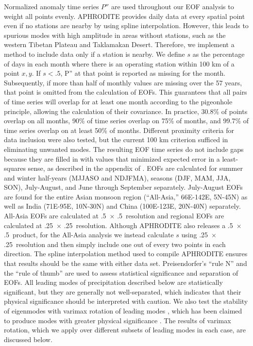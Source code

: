 \documentclass[12pt]{article}
\begin{document}
	Normalized anomaly time series $P''$ are used throughout our EOF analysis to weight all points evenly. APHRODITE provides daily data at every spatial point even if no stations are nearby by using spline interpolation. However, this leads to spurious modes with high amplitude in areas without stations, such as the western Tibetan Plateau and Taklamakan Desert. Therefore, we implement a method to include data only if a station is nearby. We define $s$ as the percentage of days in each month where there is an operating station within 100 km of a point $x,y$. If $s<.5$, P'' at that point is reported as missing for the month. Subsequently, if more than half of monthly values are missing over the 57 years, that point is omitted from the calculation of EOFs. This guarantees that all pairs of time series will overlap for at least one month according to the pigeonhole principle, allowing the calculation of their covariance. In practice, 30.8\% of points overlap on all months, 90\% of time series overlap on 75\% of months, and 99.7\% of time series overlap on at least 50\% of months. Different proximity criteria for data inclusion were also tested, but the current 100 km criterion sufficed in eliminating unwanted modes. The resulting EOF time series do not include gaps because they are filled in with values that minimized expected error in a least-squares sense, as described in the appendix of \cite{Chelton1982}. EOFs are calculated for summer and winter half-years (MJJASO and NDJFMA), seasons (DJF, MAM, JJA, SON), July-August, and June through September separately. July-August EOFs are found for the entire Asian monsoon region (``All-Asia,'' 66\textdegree E-142\textdegree E, 5\textdegree N-45\textdegree N)  as well as India (71\textdegree E-95\textdegree E, 10\textdegree N-30\textdegree N) and China (100\textdegree E-123\textdegree E, 20\textdegree N-40\textdegree N) separately. All-Asia EOFs are calculated at .5\textdegree\ $\times$ .5\textdegree\ resolution and regional EOFs are calculated at .25\textdegree\ $\times$ .25\textdegree\ resolution. Although APHRODITE also releases a .5\textdegree\ $\times$ .5\textdegree\ product, for the All-Asia analysis we instead calculate $s$ using .25\textdegree\ $\times$ .25\textdegree\ resolution and then simply include one out of every two points in each direction. The spline interpolation method used to compile APHRODITE ensures that results should be the same with either data set. Preisendorfer's ``rule N'' \citep{Preisendorfer1981} and the \cite{North1982} ``rule of thumb'' are used to assess statistical significance and separation of EOFs. All leading modes of precipitation described below are statistically significant, but they are generally not well-separated, which indicates that their physical significance should be interpreted with caution. We also test the stability of eigenmodes with varimax rotation of leading modes \citep{Kaiser1958}, which has been claimed to produce modes with greater physical significance \citep{Wilks2006}. The results of varimax rotation, which we apply over different subsets of leading modes in each case, are discussed below.
	
\end{document}
